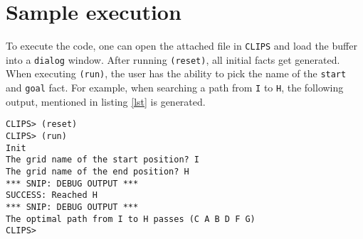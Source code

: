 \documentclass[12pt, a4paper]{article}
\begin{document}
\section{Sample execution}
To execute the code, one can open the attached file in \texttt{CLIPS} and load the buffer into a \texttt{dialog} window. After running \texttt{(reset)}, all initial facts get generated. When executing \texttt{(run)}, the user has the ability to pick the name of the \texttt{start} and \texttt{goal} fact. For example, when searching a path from \texttt{I} to \texttt{H}, the following output, mentioned in listing \ref{lst} is generated.

\begin{lstlisting}[label=lst, caption=Sample output from \texttt{I} to \texttt{H}]
CLIPS> (reset)
CLIPS> (run)
Init
The grid name of the start position? I
The grid name of the end position? H
*** SNIP: DEBUG OUTPUT ***
SUCCESS: Reached H
*** SNIP: DEBUG OUTPUT ***
The optimal path from I to H passes (C A B D F G)
CLIPS> 
\end{lstlisting}
\end{document}
